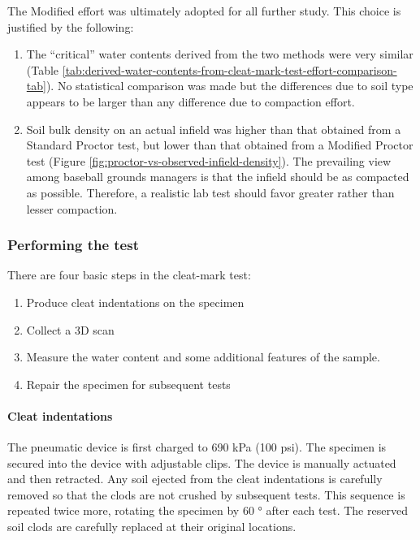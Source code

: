 \documentclass[
  letterpaper,
  openany]{book}
\begin{document}
The Modified effort was ultimately adopted for all further study.
This choice is justified by the following:

\begin{enumerate}
\def\labelenumi{\arabic{enumi}.}
\item
  The ``critical'' water contents derived from the two methods were very similar (Table \ref{tab:derived-water-contents-from-cleat-mark-test-effort-comparison-tab}). No statistical comparison was made but the differences due to soil type appears to be larger than any difference due to compaction effort.
\item
  Soil bulk density on an actual infield was higher than that obtained from a Standard Proctor test, but lower than that obtained from a Modified Proctor test (Figure \ref{fig:proctor-vs-observed-infield-density}).
  The prevailing view among baseball grounds managers is that the infield should be as compacted as possible.
  Therefore, a realistic lab test should favor greater rather than lesser compaction.
\end{enumerate}

\hypertarget{performing-cleat-mark-test}{%
\subsubsection{Performing the test}\label{performing-cleat-mark-test}}

There are four basic steps in the cleat-mark test:

\begin{enumerate}
\def\labelenumi{\arabic{enumi}.}
\item
  Produce cleat indentations on the specimen
\item
  Collect a 3D scan
\item
  Measure the water content and some additional features of the sample.
\item
  Repair the specimen for subsequent tests
\end{enumerate}

\hypertarget{cleat-indentations}{%
\paragraph{Cleat indentations}\label{cleat-indentations}}

The pneumatic device is first charged to 690 kPa (100 psi).
The specimen is secured into the device with adjustable clips.
The device is manually actuated and then retracted.
Any soil ejected from the cleat indentations is carefully removed so that the clods are not crushed by subsequent tests.
This sequence is repeated twice more, rotating the specimen by 60 ° after each test.
The reserved soil clods are carefully replaced at their original locations.
\end{document}

